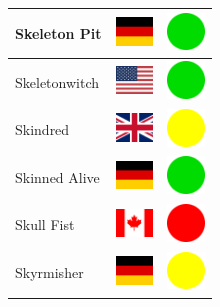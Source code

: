 \documentclass[12pt, a4paper, twoside]{report}
\begin{document}
\begin{center}
\begin{longtable}{|p{5cm}|p{2cm}|p{2cm}|}
 Skeleton Pit                                               & \includegraphics[width=1cm]{../img/flags/de} &   \includegraphics[width=1cm]{../likes/y} \\ \hline
 Skeletonwitch                                              & \includegraphics[width=1cm]{../img/flags/us} &   \includegraphics[width=1cm]{../likes/y} \\ \hline
 Skindred                                                   & \includegraphics[width=1cm]{../img/flags/gb} &   \includegraphics[width=1cm]{../likes/m} \\ \hline
 Skinned Alive                                              & \includegraphics[width=1cm]{../img/flags/de} &   \includegraphics[width=1cm]{../likes/y} \\ \hline
 Skull Fist                                                 & \includegraphics[width=1cm]{../img/flags/ca} &   \includegraphics[width=1cm]{../likes/n} \\ \hline
 Skyrmisher                                                 & \includegraphics[width=1cm]{../img/flags/de} &   \includegraphics[width=1cm]{../likes/m} \\ \hline

\end{longtable}
\end{center}
\end{document}
